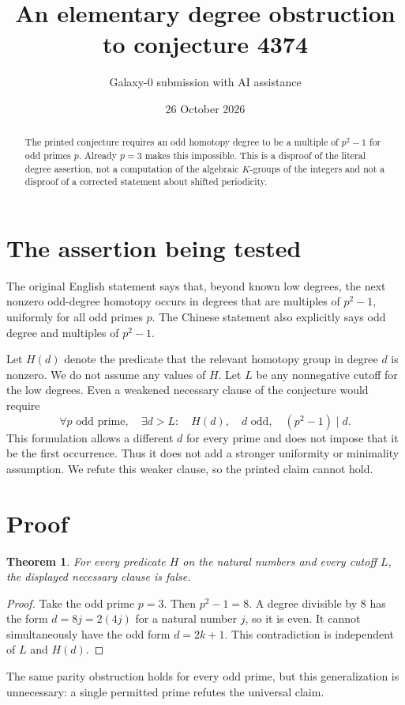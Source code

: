 \documentclass[11pt]{article}
\title{An elementary degree obstruction to conjecture 4374}
\author{Galaxy-0 submission with AI assistance}
\date{26 October 2026}
\newtheorem{theorem}{Theorem}
\begin{document}
\maketitle
\begin{abstract}
The printed conjecture requires an odd homotopy degree to be a multiple of $p^2-1$ for odd primes $p$. Already $p=3$ makes this impossible. This is a disproof of the literal degree assertion, not a computation of the algebraic $K$-groups of the integers and not a disproof of a corrected statement about shifted periodicity.
\end{abstract}
\section{The assertion being tested}
The original English statement says that, beyond known low degrees, the next nonzero odd-degree homotopy occurs in degrees that are multiples of $p^2-1$, uniformly for all odd primes $p$. The Chinese statement also explicitly says odd degree and multiples of $p^2-1$.

Let $H(d)$ denote the predicate that the relevant homotopy group in degree $d$ is nonzero. We do not assume any values of $H$. Let $L$ be any nonnegative cutoff for the low degrees. Even a weakened necessary clause of the conjecture would require
\[
 \forall p\text{ odd prime},\quad
 \exists d>L:\quad H(d),\quad d\text{ odd},\quad (p^2-1)\mid d.
\]
This formulation allows a different $d$ for every prime and does not impose that it be the first occurrence. Thus it does not add a stronger uniformity or minimality assumption. We refute this weaker clause, so the printed claim cannot hold.
\section{Proof}
\begin{theorem}
For every predicate $H$ on the natural numbers and every cutoff $L$, the displayed necessary clause is false.
\end{theorem}
\begin{proof}
Take the odd prime $p=3$. Then $p^2-1=8$. A degree divisible by $8$ has the form $d=8j=2(4j)$ for a natural number $j$, so it is even. It cannot simultaneously have the odd form $d=2k+1$. This contradiction is independent of $L$ and $H(d)$.
\end{proof}

The same parity obstruction holds for every odd prime, but this generalization is unnecessary: a single permitted prime refutes the universal claim.
\end{document}
